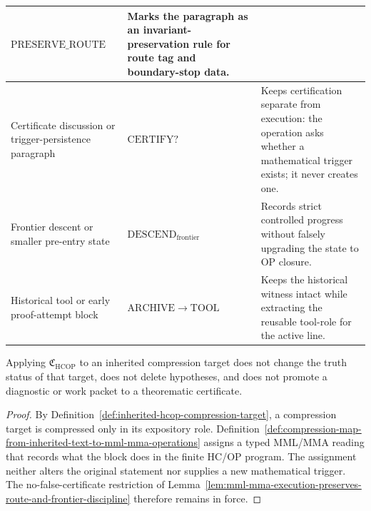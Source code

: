 \begin{definition}
{\begin{longtable}{|p{}|p{}|p{}|}
\(\mathrm{PRESERVE\_ROUTE}\) &
Marks the paragraph as an invariant-preservation rule for route tag and boundary-stop data. \\
\hline
Certificate discussion or trigger-persistence paragraph &
\(\mathrm{CERTIFY?}\) &
Keeps certification separate from execution: the operation asks whether a mathematical trigger exists; it never creates one. \\
\hline
Frontier descent or smaller pre-entry state &
\(\mathrm{DESCEND}_{\mathrm{frontier}}\) &
Records strict controlled progress without falsely upgrading the state to OP closure. \\
\hline
Historical tool or early proof-attempt block &
\(\mathrm{ARCHIVE}\to\mathrm{TOOL}\) &
Keeps the historical witness intact while extracting the reusable tool-role for the active line. \\
\hline
\end{longtable}
}
\end{definition}

\begin{lemma}
\label{lem:compression-map-preserves-proof-content}
Applying \(\mathfrak C_{\mathrm{HCOP}}\) to an inherited compression target does not change the truth status of that target, does not delete hypotheses, and does not promote a diagnostic or work packet to a theorematic certificate.
\end{lemma}

\begin{proof}
By Definition~\ref{def:inherited-hcop-compression-target}, a compression target is compressed only in its expository role. Definition~\ref{def:compression-map-from-inherited-text-to-mml-mma-operations} assigns a typed MML/MMA reading that records what the block does in the finite HC/OP program. The assignment neither alters the original statement nor supplies a new mathematical trigger. The no-false-certificate restriction of Lemma~\ref{lem:mml-mma-execution-preserves-route-and-frontier-discipline} therefore remains in force.
\end{proof}

